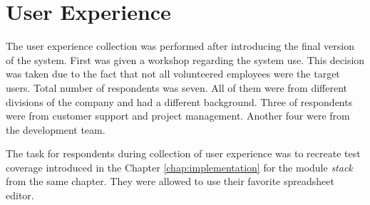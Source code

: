 \chapter{User Experience}
\label{chap:UX}
The user experience collection was performed after introducing the final version of the system. First was given a workshop regarding the system use. This decision was taken due to the fact that not all volunteered employees were the target users. Total number of respondents was seven. All of them were from different divisions of the company and had a different background. Three of respondents were from customer support and project management. Another four were from the development team. 

The task for respondents during collection of user experience was to recreate test coverage introduced in the Chapter \ref{chap:implementation} for the module \textit{stack} from the same chapter. They were allowed to use their favorite spreadsheet editor.

